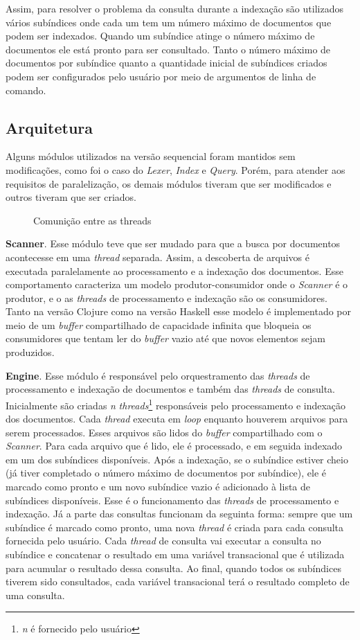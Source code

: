 Assim, para resolver o problema da consulta durante a indexação são utilizados vários subíndices onde cada um tem um número máximo de documentos que podem ser indexados. Quando um subíndice atinge o número máximo de documentos ele está pronto para ser consultado. Tanto o número máximo de documentos por subíndice quanto a quantidade inicial de subíndices criados podem ser configurados pelo usuário por meio de argumentos de linha de comando.

\subsection{Arquitetura}

Alguns módulos utilizados na versão sequencial foram mantidos sem modificações, como foi o caso do \emph{Lexer}, \emph{Index} e \emph{Query}. Porém, para atender aos requisitos de paralelização, os demais módulos tiveram que ser modificados e outros tiveram que ser criados.

\begin{figure}[h]
 \centering
 \def\svgwidth{0.6\columnwidth}
 
 \caption{Comunição entre as threads}
\end{figure}

\textbf{Scanner}. Esse módulo teve que ser mudado para que a busca por documentos acontecesse em uma \emph{thread} separada. Assim, a descoberta de arquivos é executada paralelamente ao processamento e a indexação dos documentos. Esse comportamento caracteriza um modelo produtor-consumidor onde o \emph{Scanner} é o produtor, e o as \emph{threads} de processamento e indexação são os consumidores. Tanto na versão Clojure como na versão Haskell esse modelo é implementado por meio de um \emph{buffer} compartilhado de capacidade infinita que bloqueia os consumidores que tentam ler do \emph{buffer} vazio até que novos elementos sejam produzidos.

\textbf{Engine}. Esse módulo é responsável pelo orquestramento das \emph{threads} de processamento e indexação de documentos e também das \emph{threads} de consulta. Inicialmente são criadas \emph{n} \emph{threads}\footnote{\emph{n} é fornecido pelo usuário} responsáveis pelo processamento e indexação dos documentos. Cada \emph{thread} executa em \emph{loop} enquanto houverem arquivos para serem processados. Esses arquivos são lidos do \emph{buffer} compartilhado com o \emph{Scanner}. Para cada arquivo que é lido, ele é processado, e em seguida indexado em um dos subíndices disponíveis. Após a indexação, se o subíndice estiver cheio (já tiver completado o número máximo de documentos por subíndice), ele é marcado como pronto e um novo subíndice vazio é adicionado à lista de subíndices disponíveis. Esse é o funcionamento das \emph{threads} de processamento e indexação. Já a parte das consultas funcionam da seguinta forma: sempre que um subíndice é marcado como pronto, uma nova \emph{thread} é criada para cada consulta fornecida pelo usuário. Cada \emph{thread} de consulta vai executar a consulta no subíndice e concatenar o resultado em uma variável transacional que é utilizada para acumular o resultado dessa consulta. Ao final, quando todos os subíndices tiverem sido consultados, cada variável transacional terá o resultado completo de uma consulta.

